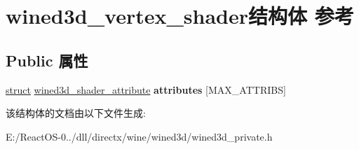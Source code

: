 \hypertarget{structwined3d__vertex__shader}{}\section{wined3d\+\_\+vertex\+\_\+shader结构体 参考}
\label{structwined3d__vertex__shader}
\subsection*{Public 属性}
\begin{DoxyCompactItemize}
\item 
\mbox{\label{structwined3d__vertex__shader_ac76eaa5bb86b9c1dc540175a2fa7bb03}} 
\hyperlink{interfacestruct}{struct} \hyperlink{structwined3d__shader__attribute}{wined3d\+\_\+shader\+\_\+attribute} {\bfseries attributes} \mbox{[}M\+A\+X\+\_\+\+A\+T\+T\+R\+I\+BS\mbox{]}
\end{DoxyCompactItemize}


该结构体的文档由以下文件生成\+:\begin{DoxyCompactItemize}
\item 
E\+:/\+React\+O\+S-\/0../dll/directx/wine/wined3d/wined3d\+\_\+private.\+h\end{DoxyCompactItemize}
